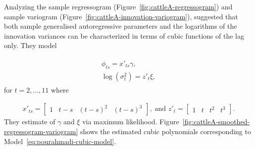 %
%


Analyzing the sample regressogram (Figure~\ref{fig:cattleA-regressogram}) and sample variogram (Figure~\ref{fig:cattleA-innovation-variogram}), \cite{pourahmadi1999joint}suggested that both sample generalised autoregressive parameters and the logarithms of the innovation variances can be characterized in terms of cubic functions of the lag only. They model 

\begin{align}
\begin{split} \label{eq:pourahmadi-cubic-model}
\phi_{ts} = x'_{ts}\gamma, \\
\log\left(\sigma_t^2\right) = z'_{t}\xi, 
\end{split}
\end{align}
\noindent
for $t = 2,\dots, 11$ where 

\begin{align*}
x'_{ts} = \begin{bmatrix} 1 & t - s& \left(t - s\right)^2 & \left(t - s\right)^3 \end{bmatrix},\; \mbox{and } z'_{t} = \begin{bmatrix} 1 & t& t^2& t^3 \end{bmatrix}.
\end{align*}
\noindent
They estimate of $\gamma$ and $\xi$ via maximum likelihood.  Figure~\ref{fig:cattleA-smoothed-regressogram-variogram} shows the estimated cubic polynomials corresponding to Model~\ref{eq:pourahmadi-cubic-model}. 




